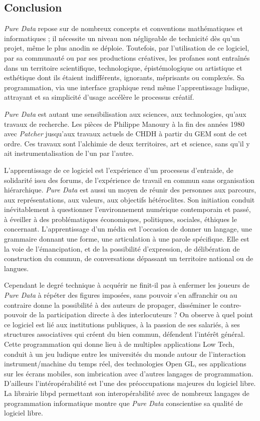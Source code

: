 \documentclass{FramateX}
\begin{document}
\begin{refsection}
\section*{Conclusion}
{}

\textit{Pure Data} repose sur de nombreux concepts et conventions mathématiques
et informatiques ; il nécessite un niveau non négligeable de technicité
dès qu'un projet, même le plus anodin se déploie. Toutefois, par
l'utilisation de ce logiciel, par sa communauté ou par ses productions
créatives, les profanes sont entraînés dans un territoire scientifique,
technologique, épistémologique ou artistique et esthétique dont ils
étaient indifférents, ignorants, méprisants ou complexés. Sa
programmation, via une interface graphique rend même l'apprentissage
ludique, attrayant et sa simplicité d'usage accélère le processus
créatif. 

\textit{Pure Data} est autant une sensibilisation aux sciences, aux technologies,
qu'aux travaux de recherche. Les pièces de Philippe Manoury à la fin
des années 1980 avec \textit{Patcher} jusqu'aux travaux actuels de CHDH à partir
du GEM sont de cet ordre. Ces travaux sont l'alchimie de deux
territoires, art et science, sans qu'il y ait instrumentalisation de
l'un par l'autre. 

L'apprentissage de ce logiciel est l'expérience d'un processus
d'entraide, de solidarité issu des forums, de l'expérience
de travail en commun sans organisation hiérarchique. \textit{Pure Data} est
aussi un moyen de réunir des personnes aux parcours, aux
représentations, aux valeurs, aux objectifs hétéroclites. Son
initiation conduit inévitablement à questionner l'environnement
numérique contemporain et passé, à éveiller à des problématiques
économiques, politiques, sociales, éthiques le concernant.
L'apprentissage d'un média est l'occasion de donner un langage, une
grammaire donnant une forme, une articulation à une parole spécifique.
Elle est la voie de l'émancipation, et de la possibilité d'expression,
de délibération de construction du commun, de conversations dépassant
un territoire national ou de langues. 

Cependant le degré technique à acquérir ne finit-il pas à enfermer les
joueurs de \textit{Pure Data} à répéter des figures imposées, sans pouvoir s'en
affranchir ou au contraire donne la possibilité à des auteurs de
propager, disséminer le contre-pouvoir de la participation directe à
des interlocuteurs ? On observe à quel point ce logiciel est lié aux
institutions publiques, à la passion de ses salariés, à ses structures
associatives qui créent du bien commun, défendent l'intérêt général.
Cette programmation qui donne lieu à de multiples applications Low
Tech, conduit à un jeu ludique entre les universités du monde autour de
l'interaction instrument/machine du temps réel, des technologies Open
GL, ses applications sur les écrans mobiles, son imbrication avec
d'autres langages de programmation. D'ailleurs
l'intéropérabilité est l'une des
préoccupations majeures du logiciel libre. La librairie libpd
permettant son interopérabilité avec de nombreux langages de
programmation informatique montre que \textit{Pure Data} conscientise sa qualité
de logiciel libre.


\end{refsection}
\end{document}
